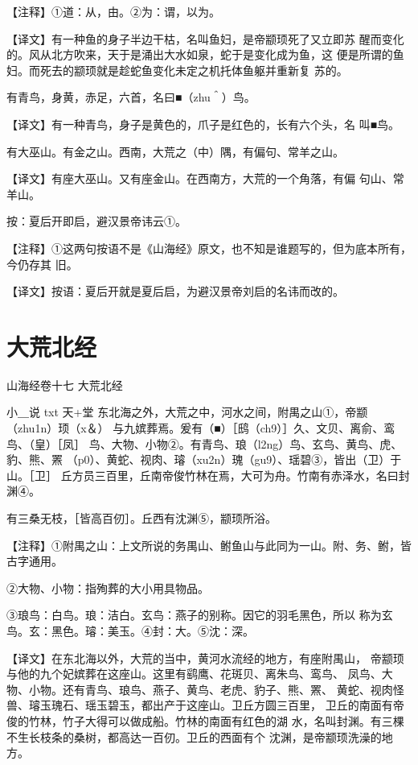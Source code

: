 \documentclass[a4paper,12pt,UTF8,twoside]{ctexbook}
\begin{document}
【注释】①道：从，由。②为：谓，以为。

【译文】有一种鱼的身子半边干枯，名叫鱼妇，是帝颛顼死了又立即苏 醒而变化的。风从北方吹来，天于是涌出大水如泉，蛇于是变化成为鱼，这 便是所谓的鱼妇。而死去的颛顼就是趁蛇鱼变化未定之机托体鱼躯并重新复 苏的。

有青鸟，身黄，赤足，六首，名曰■（zhu＾）鸟。

【译文】有一种青鸟，身子是黄色的，爪子是红色的，长有六个头，名 叫■鸟。

有大巫山。有金之山。西南，大荒之（中）隅，有偏句、常羊之山。

【译文】有座大巫山。又有座金山。在西南方，大荒的一个角落，有偏 句山、常羊山。

按：夏后开即启，避汉景帝讳云①。

【注释】①这两句按语不是《山海经》原文，也不知是谁题写的，但为底本所有，今仍存其 旧。

【译文】按语：夏后开就是夏后启，为避汉景帝刘启的名讳而改的。

\chapter{大荒北经}

山海经卷十七 大荒北经

小＿说  txt 天+堂
东北海之外，大荒之中，河水之间，附禺之山①，帝颛（zhu1n）顼（x＆） 与九嫔葬焉。爰有（■）［鸱（ch9）］久、文贝、离俞、鸾鸟、（皇）［凤］ 鸟、大物、小物②。有青鸟、琅（l2ng）鸟、玄鸟、黄鸟、虎、豹、熊、罴 （p0）、黄蛇、视肉、璿（xu2n）瑰（gu9）、瑶碧③，皆出（卫）于山。［卫］ 丘方员三百里，丘南帝俊竹林在焉，大可为舟。竹南有赤泽水，名曰封渊④。

有三桑无枝，［皆高百仞］。丘西有沈渊⑤，颛顼所浴。

【注释】①附禺之山：上文所说的务禺山、鲋鱼山与此同为一山。附、务、鲋，皆古字通用。

②大物、小物：指殉葬的大小用具物品。

③琅鸟：白鸟。琅：洁白。玄鸟：燕子的别称。因它的羽毛黑色，所以 称为玄鸟。玄：黑色。璿：美玉。④封：大。⑤沈：深。

【译文】在东北海以外，大荒的当中，黄河水流经的地方，有座附禺山， 帝颛顼与他的九个妃嫔葬在这座山。这里有鹞鹰、花斑贝、离朱鸟、鸾鸟、 凤鸟、大物、小物。还有青鸟、琅鸟、燕子、黄鸟、老虎、豹子、熊、罴、 黄蛇、视肉怪兽、璿玉瑰石、瑶玉碧玉，都出产于这座山。卫丘方圆三百里， 卫丘的南面有帝俊的竹林，竹子大得可以做成船。竹林的南面有红色的湖 水，名叫封渊。有三棵不生长枝条的桑树，都高达一百仞。卫丘的西面有个 沈渊，是帝颛顼洗澡的地方。
\end{document}

